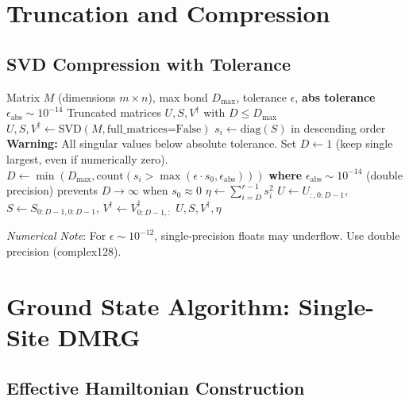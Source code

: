\documentclass[aps,prb,onecolumn,scriptaddress]{revtex4-2}
\newcommand{\eps}{\epsilon}
\begin{document}
	\section{Truncation and Compression}
	
	\subsection{SVD Compression with Tolerance}
	\begin{algorithm}[H]
		\caption{TruncateBond}
		\begin{algorithmic}[1]
			\Require Matrix $M$ (dimensions $m \times n$), max bond $D_{\max}$, tolerance $\eps$, \textbf{abs tolerance $\eps_{\text{abs}} \sim 10^{-14}$}
			\Ensure Truncated matrices $U, S, V^\dagger$ with $D \leq D_{\max}$
			\State $U, S, V^\dagger \gets \text{SVD}(M, \text{full\_matrices=False})$
			\State $s_i \gets \text{diag}(S)$ in descending order
			\State {}
			\State {}
			\If{$s_0 < \eps_{\text{abs}}$}
			\State \textbf{Warning:} All singular values below absolute tolerance.
			\State Set $D \gets 1$ (keep single largest, even if numerically zero).
			\Else
			\State $D \gets \min\left(D_{\max}, \text{count}\left(s_i > \max\left(\eps \cdot s_0, \eps_{\text{abs}}\right)\right)\right)$
			\State \textbf{where} $\eps_{\text{abs}} \sim 10^{-14}$ (double precision) prevents $D \to \infty$ when $s_0 \approx 0$
			\EndIf
			\State {}
			\State $\eta \gets \sum_{i=D}^{r-1} s_i^2$ 
			\State $U \gets U_{:,0:D-1}$, $S \gets S_{0:D-1,0:D-1}$, $V^\dagger \gets V^\dagger_{0:D-1,:}$
			\State \Return $U, S, V^\dagger, \eta$
		\end{algorithmic}
	\end{algorithm}
	
	\textit{Numerical Note}: For $\eps \sim 10^{-12}$, single-precision floats may underflow. Use double precision (complex128).
	
	\section{Ground State Algorithm: Single-Site DMRG}
	
	\subsection{Effective Hamiltonian Construction}
	
\end{document}
